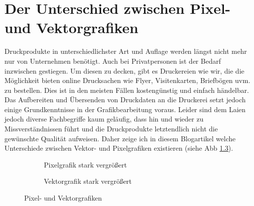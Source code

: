 \chapter{Der Unterschied zwischen Pixel- und Vektorgrafiken}
\label{cha:der_unterschied_zwischen_pixel-_und_vektorgrafiken}
Druckprodukte in unterschiedlichster Art und Auflage werden längst nicht mehr nur von Unternehmen benötigt. Auch bei Privatpersonen ist der Bedarf inzwischen gestiegen. Um diesen zu decken, gibt es Druckereien wie wir, die die Möglichkeit bieten online Drucksachen wie Flyer, Visitenkarten, Briefbögen uvm. zu bestellen. Dies ist in den meisten Fällen kostengünstig und einfach händelbar. Das Aufbereiten und Übersenden von Druckdaten an die Druckerei setzt jedoch einige Grundkenntnisse in der Grafikbearbeitung voraus. Leider sind dem Laien jedoch diverse Fachbegriffe kaum geläufig, dass hin und wieder zu Missverständnissen führt und die Druckprodukte letztendlich nicht die gewünschte Qualität aufweisen. Daher zeige ich in diesem Blogartikel welche Unterschiede zwischen Vektor- und Pixelgrafiken existieren (siehe Abb \ref{fig:pixel_vector_exp}).

\begin{figure}
\centering
	\begin{subfigure}[b]{5cm}            
		\caption{Pixelgrafik stark vergrößert}
		\label{fig:pixel}
	\end{subfigure}
%
\hspace{1cm}
%
	\begin{subfigure}[b]{5cm}
	\centering
		\caption{Vektorgrafik stark vergrößert}
		\label{fig:vector}
	\end{subfigure}

	\caption{Pixel- und Vektorgrafiken}
	\label{fig:pixel_vector_exp}
\end{figure}


